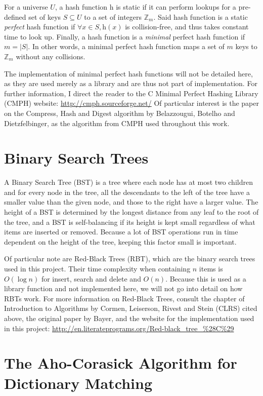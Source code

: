 \documentclass[ %
                    author={Dominic Joseph Moylett},
                    degree={MEng},
                     title={Dictionary Matching with Fingerprints},
                  subtitle={An Empirical Analysis},
                      type={research},
                      year={2015} ]{dissertation}
\begin{document}
For a universe $U$, a hash function $\text{h}$ is static if it can perform lookups for a pre-defined set of keys $S \subseteq U$ to a set of integers $\mathbb{Z}_m$. Said hash function is a static \textit{perfect} hash function if $\forall x \in S, \text{h}(x)$ is collision-free, and thus takes constant time to look up. Finally, a hash function is a \textit{minimal} perfect hash function if $m = |S|$. In other words, a minimal perfect hash function maps a set of $m$ keys to $\mathbb{Z}_m$ without any collisions.

The implementation of minimal perfect hash functions will not be detailed here, as they are used merely as a library and are thus not part of implementation. For further information, I direct the reader to the C Minimal Perfect Hashing Library (CMPH) website: \url{http://cmph.sourceforge.net/} Of particular interest is the paper on the Compress, Hash and Digest algorithm by Belazzougui, Botelho and Dietzfelbinger\cite{belazzougui:chd}, as the algorithm from CMPH used throughout this work.

\section{Binary Search Trees}
A Binary Search Tree (BST)\cite{clrs:bst} is a tree where each node has at most two children and for every node in the tree, all the descendants to the left of the tree have a smaller value than the given node, and those to the right have a larger value. The height of a BST is determined by the longest distance from any leaf to the root of the tree, and a BST is self-balancing if its height is kept small regardless of what items are inserted or removed. Because a lot of BST operations run in time dependent on the height of the tree, keeping this factor small is important.

Of particular note are Red-Black Trees (RBT)\cite{clrs:rbt}, which are the binary search trees used in this project. Their time complexity when containing $n$ items is $O(\log n)$ for insert, search and delete and $O(n)$. Because this is used as a library function and not implemented here, we will not go into detail on how RBTs work. For more information on Red-Black Trees, consult the chapter of Introduction to Algorithms by Cormen, Leiserson, Rivest and Stein (CLRS) cited above, the original paper by Bayer\cite{bayer:rbt}, and the website for the implementation used in this project: \url{http://en.literateprograms.org/Red-black_tree_%28C%29}

\section{The Aho-Corasick Algorithm for Dictionary Matching}
\label{sec:aho-corasick}
\end{document}
